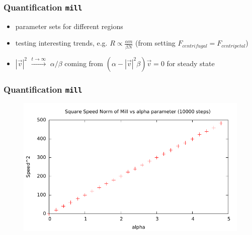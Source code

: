 \documentclass[compress]{beamer}
\begin{document}
\begin{frame}
	\frametitle{Quantification \texttt{mill}}
	\begin{itemize}
		\item parameter sets for different regions
		\item testing interesting trends, e.g. \( R \propto \frac{\alpha m}{\beta N}\) (from setting \( F_{centrifugal} = F_{centripetal} \))
		\item \( |\vec{v}|^{2} \) \( \xrightarrow{t \to \infty} \) \( \alpha / \beta \) coming from \( (\alpha - |\vec{v}|^2 \beta ) \vec{v} = 0 \) for steady state
	\end{itemize}
\end{frame}



\begin{frame}
	\frametitle{Quantification \texttt{mill}}
	\begin{figure}[H]
		\includegraphics[width=1. \columnwidth]{../plots/mill_II_square_alpha_10000.pdf}
	\end{figure}
\end{frame}
\end{document}

